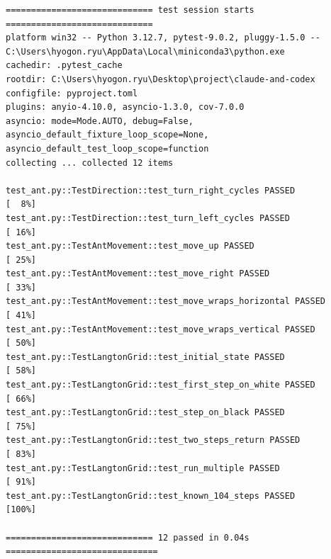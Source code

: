 \documentclass[11pt,a4paper]{article}
\begin{document}
\begin{lstlisting}
============================= test session starts =============================
platform win32 -- Python 3.12.7, pytest-9.0.2, pluggy-1.5.0 -- C:\Users\hyogon.ryu\AppData\Local\miniconda3\python.exe
cachedir: .pytest_cache
rootdir: C:\Users\hyogon.ryu\Desktop\project\claude-and-codex
configfile: pyproject.toml
plugins: anyio-4.10.0, asyncio-1.3.0, cov-7.0.0
asyncio: mode=Mode.AUTO, debug=False, asyncio_default_fixture_loop_scope=None, asyncio_default_test_loop_scope=function
collecting ... collected 12 items

test_ant.py::TestDirection::test_turn_right_cycles PASSED                [  8%]
test_ant.py::TestDirection::test_turn_left_cycles PASSED                 [ 16%]
test_ant.py::TestAntMovement::test_move_up PASSED                        [ 25%]
test_ant.py::TestAntMovement::test_move_right PASSED                     [ 33%]
test_ant.py::TestAntMovement::test_move_wraps_horizontal PASSED          [ 41%]
test_ant.py::TestAntMovement::test_move_wraps_vertical PASSED            [ 50%]
test_ant.py::TestLangtonGrid::test_initial_state PASSED                  [ 58%]
test_ant.py::TestLangtonGrid::test_first_step_on_white PASSED            [ 66%]
test_ant.py::TestLangtonGrid::test_step_on_black PASSED                  [ 75%]
test_ant.py::TestLangtonGrid::test_two_steps_return PASSED               [ 83%]
test_ant.py::TestLangtonGrid::test_run_multiple PASSED                   [ 91%]
test_ant.py::TestLangtonGrid::test_known_104_steps PASSED                [100%]

============================= 12 passed in 0.04s ==============================
\end{lstlisting}
\end{document}
